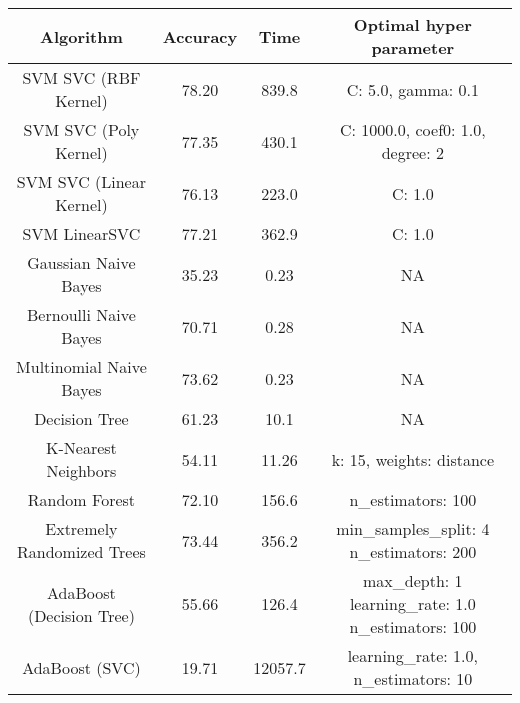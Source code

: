 \begin{table}
\begin{center}
	\begin{tabular}{c|c|c|c}
    \hline
	     Algorithm   & Accuracy & Time & Optimal hyper parameter\\
         \hline
         \hline
         SVM SVC (RBF Kernel)   & 78.20  & 839.8 & C: 5.0, gamma: 0.1\\
         \hline
         SVM SVC (Poly Kernel)  & 77.35  & 430.1 & C: 1000.0, coef0: 1.0, degree: 2\\
         \hline
         SVM SVC (Linear Kernel)   &  76.13  & 223.0 & C: 1.0\\
         \hline
         SVM LinearSVC    &  77.21   &362.9  & C: 1.0\\
         \hline
         \hline
         Gaussian Naive Bayes & 35.23 & 0.23 & NA \\
         \hline
         Bernoulli Naive Bayes &   70.71    & 0.28  & NA \\
         \hline
         Multinomial Naive Bayes & 73.62 	& 0.23  & NA \\
         \hline
         \hline
         Decision Tree &  61.23 & 10.1 & NA \\
         \hline
         \hline
         K-Nearest Neighbors & 54.11 & 11.26 & k: 15, weights:  distance\\
         \hline
         \hline
         Random Forest & 72.10 & 156.6 & n\_estimators: 100\\
         \hline
         Extremely Randomized Trees & 73.44 & 356.2 &
         \shortstack{min\_samples\_split: 4\\
         n\_estimators: 200} \\
         \hline
         AdaBoost (Decision Tree) & 55.66 & 126.4 &\shortstack{ max\_depth: 1\\ learning\_rate: 1.0\\ n\_estimators: 100}\\
         \hline
         AdaBoost (SVC) & 19.71 & 12057.7 & learning\_rate: 1.0,
         n\_estimators: 10\\
         \hline
          \end{tabular}
\end{center}
\end{table}
